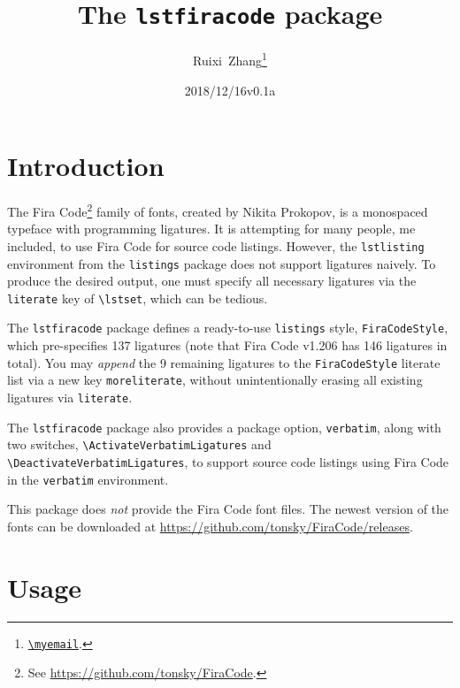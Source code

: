 \documentclass[11pt,draft]{article}
\title{The \texttt{lstfiracode} package}
\author{Ruixi~Zhang\thanks{\href{mailto:\myemail}{\nolinkurl{\myemail}}.}}
\date{2018/12/16\enskip v0.1a}
\begin{document}
\maketitle

\tableofcontents
{}

\section{Introduction}

The Fira Code\footnote{See \url{https://github.com/tonsky/FiraCode}.} family
of fonts, created by Nikita Prokopov, is a monospaced typeface with
programming ligatures.
It is attempting for many people, me included, to use Fira Code for source
code listings.
However, the \verb|lstlisting| environment from the \verb|listings| package
does not support ligatures naively. To produce the desired output, one must
specify all necessary ligatures via the \verb|literate| key
of \verb|\lstset|, which can be tedious.

The \verb|lstfiracode| package defines a ready-to-use \verb|listings| style,
\verb|FiraCodeStyle|, which pre-specifies 137 ligatures
(note that Fira Code v1.206 has 146 ligatures in total).
You may \emph{append} the 9 remaining ligatures to the \verb|FiraCodeStyle|
literate list via a new key \verb|moreliterate|, without unintentionally
erasing all existing ligatures via \verb|literate|.

The \verb|lstfiracode| package also provides a package option,
\verb|verbatim|, along with two switches,
\verb|\ActivateVerbatimLigatures| and \verb|\DeactivateVerbatimLigatures|,
to support source code listings using Fira Code
in the \verb|verbatim| environment.

This package does \emph{not} provide the Fira Code font files.
The newest version of the fonts can be downloaded at
\url{https://github.com/tonsky/FiraCode/releases}.

\section{Usage}
\end{document}
